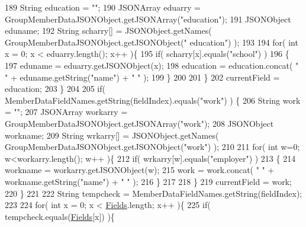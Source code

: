 \begin{DoxyCode}
189                     String education = \textcolor{stringliteral}{""};
190                     JSONArray eduarry = GroupMemberDataJSONObject.getJSONArray(\textcolor{stringliteral}{"education"});
191                     JSONObject eduname;
192                     String scharry[] = JSONObject.getNames( GroupMemberDataJSONObject.getJSONObject(\textcolor{stringliteral}{"
      education"}) );
193 
194                     \textcolor{keywordflow}{for}( \textcolor{keywordtype}{int} x = 0; x < eduarry.length(); x++ )\{
195                         \textcolor{keywordflow}{if}( scharry[x].equals(\textcolor{stringliteral}{"school"}) )
196                         \{
197                             eduname = eduarry.getJSONObject(x);
198                             education = education.concat( \textcolor{stringliteral}{" "} + eduname.getString(\textcolor{stringliteral}{"name"}) + \textcolor{stringliteral}{" "} );
199                         \}
200     
201                     \}
202                     currentField = education;
203                 \}
204                 
205                 \textcolor{keywordflow}{if}( MemberDataFieldNames.getString(fieldIndex).equals(\textcolor{stringliteral}{"work"}) ) \{
206                     String work = \textcolor{stringliteral}{""};
207                     JSONArray workarry = GroupMemberDataJSONObject.getJSONArray(\textcolor{stringliteral}{"work"});
208                     JSONObject workname;
209                     String wrkarry[] = JSONObject.getNames( GroupMemberDataJSONObject.getJSONObject(\textcolor{stringliteral}{"work"})
       );
210 
211                     \textcolor{keywordflow}{for}( \textcolor{keywordtype}{int} w=0; w<workarry.length(); w++ )\{
212                         \textcolor{keywordflow}{if}( wrkarry[w].equals(\textcolor{stringliteral}{"employer"}) )
213                         \{
214                             workname = workarry.getJSONObject(w);
215                             work = work.concat( \textcolor{stringliteral}{" "} + workname.getString(\textcolor{stringliteral}{"name"}) + \textcolor{stringliteral}{" "} );
216                         \}
217     
218                     \}
219                     currentField = work;
220                 \}
221 
222                 String tempcheck = MemberDataFieldNames.getString(fieldIndex);
223                 
224                 \textcolor{keywordflow}{for}( \textcolor{keywordtype}{int} x = 0; x < \hyperlink{classorg_1_1facebook_1_1crawler_1_1_facebook_json_parser_a5e950f9470c73a8ee7cfdafbe95ab100}{Fields}.length; x++ )\{
225                     \textcolor{keywordflow}{if}( tempcheck.equals(\hyperlink{classorg_1_1facebook_1_1crawler_1_1_facebook_json_parser_a5e950f9470c73a8ee7cfdafbe95ab100}{Fields}[x]) )\{

\end{DoxyCode}
